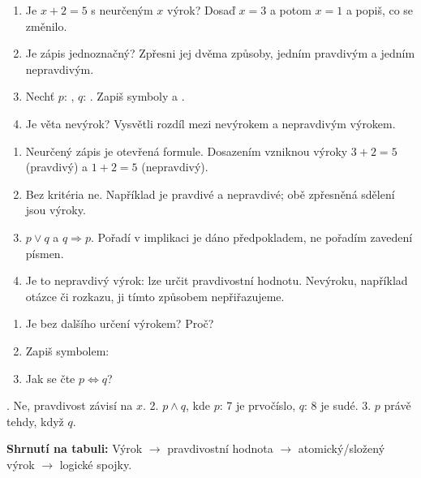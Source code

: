 \documentclass[11pt,a4paper]{article}
\begin{document}
\begin{zadaniReseniBox}[title={Rozšíření 1},breakable=false]
\begin{enumerate}[label=\alph*)]
\item Je $x+2=5$ s neurčeným $x$ výrok? Dosaď $x=3$ a potom $x=1$ a popiš, co se změnilo.
\item Je zápis  jednoznačný? Zpřesni jej dvěma způsoby, jedním pravdivým a jedním nepravdivým.
\item Nechť $p$: , $q$: . Zapiš symboly  a .
\item Je věta  nevýrok? Vysvětli rozdíl mezi nevýrokem a nepravdivým výrokem.
\end{enumerate}
\tcblower
\begin{enumerate}[label=\alph*)]
\item Neurčený zápis je otevřená formule. Dosazením vzniknou výroky $3+2=5$ (pravdivý) a $1+2=5$ (nepravdivý).
\item Bez kritéria ne. Například  je pravdivé a  nepravdivé; obě zpřesněná sdělení jsou výroky.
\item $p\lor q$ a $q\Rightarrow p$. Pořadí v implikaci je dáno předpokladem, ne pořadím zavedení písmen.
\item Je to nepravdivý výrok: lze určit pravdivostní hodnotu. Nevýroku, například otázce či rozkazu, ji tímto způsobem nepřiřazujeme.
\end{enumerate}
\end{zadaniReseniBox}

\begin{zadaniReseniBox}[title={Samostatná práce 4}]
\begin{enumerate}
  \item Je  bez dalšího určení výrokem? Proč?
  \item Zapiš symbolem: 
  \item Jak se čte $p\Leftrightarrow q$?
\end{enumerate}
. Ne, pravdivost závisí na $x$. 2. $p\land q$, kde $p$: 7 je prvočíslo, $q$: 8 je sudé. 3. $p$ právě tehdy, když $q$.
\end{zadaniReseniBox}

\textbf{Shrnutí na tabuli:} \;Výrok $\to$ pravdivostní hodnota $\to$ atomický/složený výrok $\to$ logické spojky.
\end{document}
